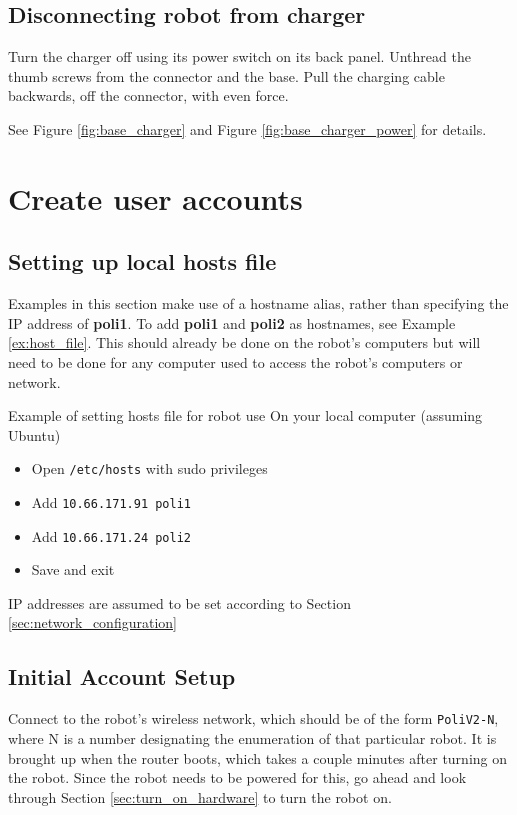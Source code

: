 \subsection{Disconnecting robot from charger}
Turn the charger off using its power switch on its back panel. Unthread the thumb screws from the connector and the base. Pull the charging cable backwards, off the connector, with even force.

See Figure \ref{fig:base_charger} and Figure \ref{fig:base_charger_power} for details. 


\section{Create user accounts}\label{sec:user_accounts}
\subsection{Setting up local hosts file}
Examples in this section make use of a hostname alias, rather than specifying the IP address of \textbf{poli1}. 
To add \textbf{poli1} and \textbf{poli2} as hostnames, see Example \ref{ex:host_file}. 
This should already be done on the robot's computers but will need to be done for any computer used to access the robot's computers or network. 

\begin{example}{Example of setting hosts file for robot use}
  \label{ex:host_file}
  On your local computer (assuming Ubuntu)
  \begin{itemize}
    \item Open \texttt{/etc/hosts} with sudo privileges 
	\item Add \texttt{10.66.171.91 poli1}
    \item Add \texttt{10.66.171.24 poli2}
    \item Save and exit
  \end{itemize}
  IP addresses are assumed to be set according to Section \ref{sec:network_configuration}
\end{example}

\subsection{Initial Account Setup}
Connect to the robot's wireless network, which should be of the form \texttt{PoliV2-N}, where N is a number designating the enumeration of that particular robot. It is brought up when the router boots, which takes a couple minutes after turning on the robot. Since the robot needs to be powered for this, go ahead and look through Section \ref{sec:turn_on_hardware} to turn the robot on. \\


